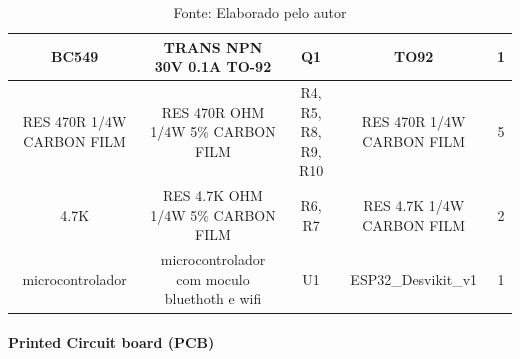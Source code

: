 \documentclass[../delivery_hospital_report.tex]{subfiles}
\begin{document}
\begin{table}[]
\begin{adjustbox}{width=\columnwidth,center}
\begin{tabular}{|c|c|c|c|c|}
BC549                       & TRANS NPN 30V 0.1A   TO-92                                     & Q1                                                            & TO92                        & 1        \\ \hline
RES 470R 1/4W   CARBON FILM & RES 470R OHM 1/4W 5\%   CARBON FILM                            & R4, R5, R8, R9, R10                                           & RES 470R 1/4W CARBON   FILM & 5        \\ \hline
4.7K                        & RES 4.7K OHM 1/4W 5\%   CARBON FILM                            & R6, R7                                                        & RES 4.7K 1/4W CARBON   FILM & 2        \\ \hline
microcontrolador            & microcontrolador com   moculo bluethoth e wifi                 & U1                                                            & ESP32\_Desvikit\_v1         & 1        \\ \hline

\end{tabular}
\end{adjustbox}
\centering
\caption*{Fonte: Elaborado pelo autor}
\label{table:voc}
\end{table}


\paragraph{Printed Circuit board (PCB)}
\end{document}
